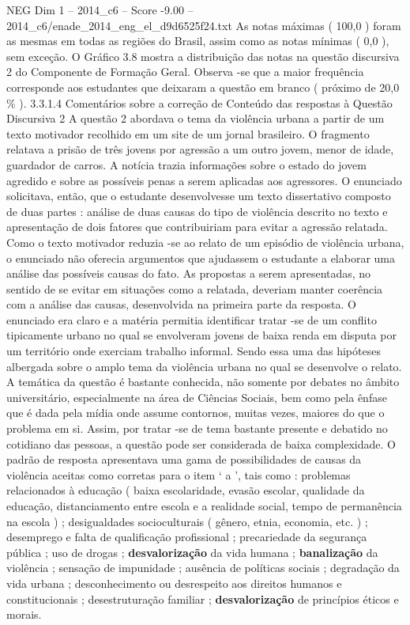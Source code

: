 \begin{textsample}{NEG Dim 1 – 2014\_c6 – Score -9.00 – 2014\_c6/enade\_2014\_eng\_el\_d9d6525f24.txt}
As notas máximas ( 100,0 ) foram as mesmas em todas as regiões do Brasil, assim como as notas mínimas ( 0,0 ), sem exceção.
O Gráfico 3.8 mostra a distribuição das notas na questão discursiva 2 do Componente de Formação Geral.
Observa -se que a maior frequência corresponde aos estudantes que deixaram a questão em branco ( próximo de 20,0 \% ). 3.3.1.4 Comentários sobre a correção de Conteúdo das respostas à Questão Discursiva 2 A questão 2 abordava o tema da violência urbana a partir de um texto motivador recolhido em um site de um jornal brasileiro.
O fragmento relatava a prisão de três jovens por agressão a um outro jovem, menor de idade, guardador de carros.
A notícia trazia informações sobre o estado do jovem agredido e sobre as possíveis penas a serem aplicadas aos agressores.
O enunciado solicitava, então, que o estudante desenvolvesse um texto dissertativo composto de duas partes : análise de duas causas do tipo de violência descrito no texto e apresentação de dois fatores que contribuiriam para evitar a agressão relatada.
Como o texto motivador reduzia -se ao relato de um episódio de violência urbana, o enunciado não oferecia argumentos que ajudassem o estudante a elaborar uma análise das possíveis causas do fato.
As propostas a serem apresentadas, no sentido de se evitar em situações como a relatada, deveriam manter coerência com a análise das causas, desenvolvida na primeira parte da resposta.
O enunciado era claro e a matéria permitia identificar tratar -se de um conflito tipicamente urbano no qual se envolveram jovens de baixa renda em disputa por um território onde exerciam trabalho informal.
Sendo essa uma das hipóteses albergada sobre o amplo tema da violência urbana no qual se desenvolve o relato.
A temática da questão é bastante conhecida, não somente por debates no âmbito universitário, especialmente na área de Ciências Sociais, bem como pela ênfase que é dada pela mídia onde assume contornos, muitas vezes, maiores do que o problema em si.
Assim, por tratar -se de tema bastante presente e debatido no cotidiano das pessoas, a questão pode ser considerada de baixa complexidade.
O padrão de resposta apresentava uma gama de possibilidades de causas da violência aceitas como corretas para o item ‘ a ’, tais como : problemas relacionados à educação ( baixa escolaridade, evasão escolar, qualidade da educação, distanciamento entre escola e a realidade social, tempo de permanência na escola ) ; desigualdades socioculturais ( gênero, etnia, economia, etc. ) ; desemprego e falta de qualificação profissional ; precariedade da segurança pública ; uso de drogas ; \textbf{desvalorização} da vida humana ; \textbf{banalização} da violência ; sensação de impunidade ; ausência de políticas sociais ; degradação da vida urbana ; desconhecimento ou desrespeito aos direitos humanos e constitucionais ; desestruturação familiar ; \textbf{desvalorização} de princípios éticos e morais.

\end{textsample}
